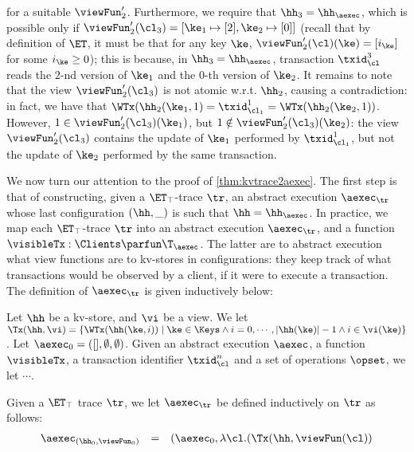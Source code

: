 \begin{example}
for a suitable $\viewFun_2'$.
Furthermore, we require that $\hh_3 = \hh_{\aexec}$, which is possible only if $\viewFun_2'(\cl_3) = [\ke_1 \mapsto [2], \ke_2 \mapsto [0] ]$ 
(recall that by definition of $\ET$, it must be that for any key $\ke$, $\viewFun_2'(\cl)(\ke) = [i_{\ke}]$ for some $i_{\ke} \geq 0$); 
this is because, in $\hh_3 = \hh_{\aexec}$, transaction $\txid_{\cl}^3$ reads the $2$-nd version of $\ke_1$ and the $0$-th version of 
$\ke_2$. It remains to note that the view $\viewFun_{2}'(\cl_3)$ is not atomic w.r.t. $\hh_2$, causing a contradiction: 
in fact, we have that $\WTx(\hh_{2}(\ke_1, 1) = \txid_{\cl_1}^{1} = \WTx(\hh_2(\ke_2, 1))$. However, 
$1 \in \viewFun_{2}'(\cl_3)(\ke_1)$, but $1 \notin \viewFun_{2}'(\cl_3)(\ke_2)$: the view $\viewFun_{2}'(\cl_3)$ 
contains the update of $\ke_1$ performed by $\txid_{\cl_1}^{1}$, but not the update of $\ke_2$ performed by the 
same transaction.
\end{example}

We now turn our attention to the proof of \cref{thm:kvtrace2aexec}. 
The first step is that of constructing, given a $\ET_{\top}$-trace $\tr$, 
an abstract execution $\aexec_{\tr}$ whose last configuration $(\hh, \_)$ 
is such that $\hh = \hh_{\aexec}$. In practice, we map each $\ET_{\top}$-trace 
$\tr$ into an abstract execution $\aexec_{\tr}$, and a function $\visibleTx: \Clients \parfun \T_{\aexec}$. 
The latter are to abstract execution what view functions are to kv-stores in configurations: they keep 
track of what transactions would be observed by a client, if it were to execute a transaction. 
The definition of $\aexec_{\tr}$ is given inductively below: 

\begin{definition}
Let $\hh$ be a kv-store, and $\vi$ be a view. We let $\Tx(\hh, \vi) = \{ \WTx(\hh(\ke, i)) \mid \ke \in \Keys \wedge 
i = 0,\cdots, \lvert \hh(\ke) \rvert - 1 \wedge i \in \vi(\ke) \}$. 
Let $\aexec_0 = ( [ ], \emptyset, \emptyset)$. Given an abstract execution $\aexec$, a function 
$\visibleTx$, a transaction identifier $\txid_{\cl}^{n}$ and a set of operations $\opset$, we let 
$\cdots$.

Given a $\ET_{\top}$ trace $\tr$, we let $\aexec_{\tr}$ be defined inductively on $\tr$ as follows:
\[
\begin{array}{lcl}
\aexec_{(\hh_0, \viewFun_0)} &=& (\aexec_0, \lambda \cl.(\Tx(\hh, \viewFun(\cl))
\end{array}
\]

\end{definition}

